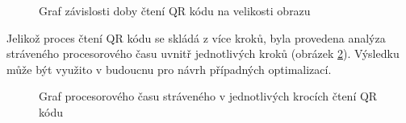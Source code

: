  \begin{figure}[H]
  \begin{center}
    \caption{Graf závislosti doby čtení QR kódu na velikosti obrazu}
    \label{decodeFPS}
  \end{center}
\end{figure}

Jelikož proces čtení QR kódu se skládá z více kroků, byla provedena analýza
stráveného procesorového času uvnitř jednotlivých kroků (obrázek
\ref{decodingStepsOverview}). Výsledku může být využito v budoucnu pro návrh
případných optimalizací.

 \begin{figure}[H]
  \begin{center}
    \caption{Graf procesorového času stráveného v jednotlivých
    krocích čtení QR kódu}
    \label{decodingStepsOverview}
  \end{center}
\end{figure}

